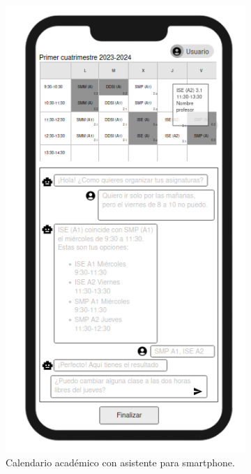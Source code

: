 \begin{figure}[!tb]
    \centering
    \begin{subfigure}[b]{0.4\textwidth}
        \includegraphics[width=\textwidth]{./imagenes/Mockups_smartphone.png}
        \caption{Calendario académico con asistente para smartphone.}
    \end{subfigure}
    \begin{subfigure}[b]{0.7\textwidth}

\end{subfigure}
\end{figure}
